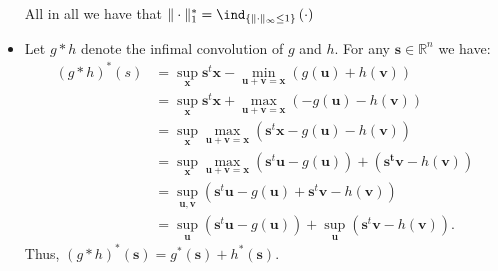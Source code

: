 \documentclass{article}
\begin{document}
\begin{itemize}
           All in all we have that
           $\|\cdot\|^{*}_{1} = \ind_{\left\{
           \|\cdot\|_{\infty} \leq 1\right\}}\left(\cdot\right)$
       \item Let $g * h$ denote the
           infimal convolution of $g$ and $h$.
           For any $\mathbf{s} \in \mathbb{R}^n$
           we have:
           \begin{align*}
               \left(g * h\right)^*\left(s\right) &=
               \sup_{\mathbf{x}} \mathbf{s}^t\mathbf{x}
               - \min_{\mathbf{u} + \mathbf{v} = \mathbf{x}}
               \left(g\left(\mathbf{u}\right) + h\left(\mathbf{v}\right)\right) \\
               &= \sup_{\mathbf{x}} \mathbf{s}^t\mathbf{x} + \max_{\mathbf{u} + \mathbf{v} = \mathbf{x}}
               \left(- g\left(\mathbf{u}\right) - h\left(\mathbf{v}\right)\right)\\
               &= \sup_{\mathbf{x}} \max_{\mathbf{u}+\mathbf{v}=\mathbf{x}}
               \left(\mathbf{s}^t\mathbf{x} - g\left(\mathbf{u}\right)
               -h\left(\mathbf{v}\right)\right) \\
               &= \sup_{\mathbf{x}} \max_{\mathbf{u}+\mathbf{v}=\mathbf{x}}
               \left(\mathbf{s}^t\mathbf{u} - g\left(\mathbf{u}\right)\right) + 
               \left(\mathbf{s^t}\mathbf{v} - h\left(\mathbf{v}\right)\right)\\
               &= \sup_{\mathbf{u}, \mathbf{v}} \left(
               \mathbf{s}^t\mathbf{u} - g\left(\mathbf{u}\right)
                 + \mathbf{s}^t\mathbf{v}
                 - h\left(\mathbf{v}\right)\right) \\
               &= \sup_{\mathbf{u}} \left(\mathbf{s}^t\mathbf{u} -g\left(\mathbf{u}\right)\right)
                +\sup_{\mathbf{u}} \left( \mathbf{s}^t\mathbf{v}
                - h\left(\mathbf{v}\right)\right).
           \end{align*}
           Thus, $\left(g *h\right)^*\left(\mathbf{s}\right)
           = g^*\left(\mathbf{s}\right) +
           h^*\left(\mathbf{s}\right)$.


\end{itemize}
\end{document}

